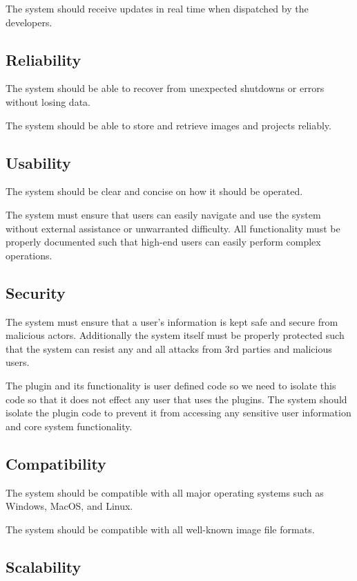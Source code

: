 \documentclass[11pt,a4paper]{article}
\begin{document}
The system should receive updates in real time when dispatched by the developers.

\subsection*{Reliability} 

The system should be able to recover from unexpected shutdowns or errors without
losing data.

The system should be able to store and retrieve images and projects reliably.

\subsection*{Usability} 
The system should be clear and concise on how it should be operated. 

The system must ensure that users can easily navigate and use the system without external assistance or unwarranted difficulty. All functionality must be properly documented such that high-end users can easily perform complex operations.

\subsection*{Security} 

The system must ensure that a user's information is kept safe and secure from malicious actors. 
Additionally the system itself must be properly protected such that the system can resist any and all attacks from 3rd parties and malicious users. 

The plugin and its functionality is user defined code so we need to isolate this code so that it does not effect any user that uses the plugins. The system should isolate the plugin code to prevent it from accessing any sensitive user information and core system functionality.

\subsection*{Compatibility} 

The system should be compatible with all major operating systems such as Windows, MacOS, and Linux.

The system should be compatible with all well-known image file formats.


\subsection*{Scalability}
\end{document}
